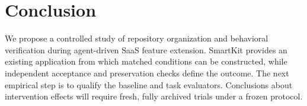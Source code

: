 \documentclass[11pt,a4paper]{article}
\begin{document}
\section{Conclusion}
We propose a controlled study of repository organization and behavioral verification during agent-driven SaaS feature extension. SmartKit provides an existing application from which matched conditions can be constructed, while independent acceptance and preservation checks define the outcome. The next empirical step is to qualify the baseline and task evaluators. Conclusions about intervention effects will require fresh, fully archived trials under a frozen protocol.

\clearpage

\begingroup
\small
\setlength{\bibsep}{4pt}
\raggedright

\endgroup
\end{document}
